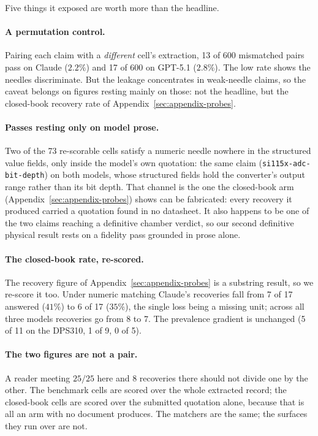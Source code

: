 \documentclass[11pt]{article}
\begin{document}
Five things it exposed are worth more than the headline.

\paragraph{A permutation control.} Pairing each claim with a
\emph{different} cell's extraction, 13 of 600 mismatched pairs pass on
Claude ($2.2\%$) and 17 of 600 on GPT-5.1 ($2.8\%$). The low rate
shows the needles discriminate. But the leakage concentrates in
weak-needle claims, so the caveat belongs on figures resting mainly on
those: not the headline, but the closed-book recovery rate of
Appendix~\ref{sec:appendix-probes}.

\paragraph{Passes resting only on model prose.} Two of the 73
re-scorable cells satisfy a numeric needle nowhere in the structured
value fields, only inside the model's own quotation: the same claim
(\texttt{si115x-adc-bit-depth}) on both models, whose structured fields
hold the converter's output range rather than its bit depth. That
channel is the one the closed-book arm
(Appendix~\ref{sec:appendix-probes}) shows can be fabricated: every
recovery it produced carried a quotation found in no datasheet. It also
happens to be one of the two claims reaching a definitive chamber
verdict, so our second definitive physical result rests on a fidelity
pass grounded in prose alone.

\paragraph{The closed-book rate, re-scored.} The recovery figure of
Appendix~\ref{sec:appendix-probes} is a substring result, so we
re-score it too. Under numeric matching
Claude's recoveries fall from 7 of 17 answered ($41\%$) to 6 of 17
($35\%$), the single loss being a missing unit; across all three models
recoveries go from 8 to 7. The prevalence gradient is unchanged
(5 of 11 on the DPS310, 1 of 9, 0 of 5).

\paragraph{The two figures are not a pair.} A reader meeting $25/25$
here and 8 recoveries there should not divide one by the other. The
benchmark cells are scored over the whole extracted record; the
closed-book cells are scored over the submitted quotation alone, because
that is all an arm with no document produces. The matchers are the same;
the surfaces they run over are not.
\end{document}
